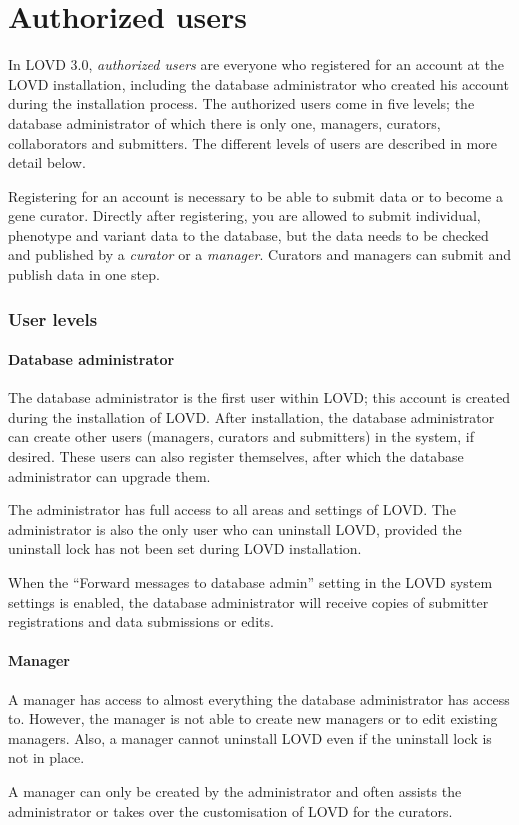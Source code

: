 \documentclass[a4paper,oneside,openany,12pt]{memoir}
\begin{document}
\chapter{Authorized users}
In LOVD 3.0, \emph{authorized users} are everyone who registered for an account at the LOVD installation, including the database administrator who created his account during the installation process.
The authorized users come in five levels; the database administrator of which there is only one, managers, curators, collaborators and submitters.
The different levels of users are described in more detail below.
\par
Registering for an account is necessary to be able to submit data or to become a gene curator.
Directly after registering, you are allowed to submit individual, phenotype and variant data to the database, but the data needs to be checked and published by a \emph{curator} or a \emph{manager}.
Curators and managers can submit and publish data in one step.



\subsection{User levels}
\subsubsection{Database administrator}
The database administrator is the first user within LOVD; this account is created during the installation of LOVD.
After installation, the database administrator can create other users (managers, curators and submitters) in the system, if desired.
These users can also register themselves, after which the database administrator can upgrade them.
\par
The administrator has full access to all areas and settings of LOVD.
The administrator is also the only user who can uninstall LOVD, provided the uninstall lock has not been set during LOVD installation.
\\
\par
When the ``Forward messages to database admin'' setting in the LOVD system settings is enabled, the database administrator will receive copies of submitter registrations and data submissions or edits.

\subsubsection{Manager}
A manager has access to almost everything the database administrator has access to.
However, the manager is not able to create new managers or to edit existing managers.
Also, a manager cannot uninstall LOVD even if the uninstall lock is not in place.
\\
\par
A manager can only be created by the administrator and often assists the administrator or takes over the customisation of LOVD for the curators.
\end{document}
